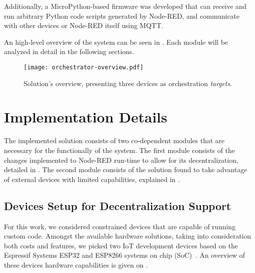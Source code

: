 Additionally, a MicroPython-based firmware was developed that can receive and run arbitrary Python code scripts generated by Node-RED, and communicate with other devices or Node-RED itself using MQTT. 

An high-level overview of the system can be seen in . Each module will be analyzed in detail in the following sections.

\begin{figure}[h]
    \centering
    \texttt{[image: orchestrator-overview.pdf]}
    \caption{Solution's overview, presenting three devices as orchestration \textit{targets}.}
    \label{fig:solution_overview}
\end{figure}

\section{Implementation Details}\label{sec:implementation_details}

The implemented solution consists of two co-dependent modules that are necessary for the functionally of the system. The first module consists of the changes implemented to Node-RED run-time to allow for its decentralization, detailed in . The second module consists of the solution found to take advantage of external devices with limited capabilities, explained in .

\subsection{Devices Setup for Decentralization Support}\label{sec:devices_decentralization}

For this work, we considered constrained devices that are capable of running custom code. Amongst the available hardware solutions, taking into consideration both costs and features, we picked two IoT development devices based on the Espressif Systems ESP32 and ESP8266 systems on chip (SoC)~\cite{esp32,esp8266}. An overview of these devices hardware capabilities is given on .

